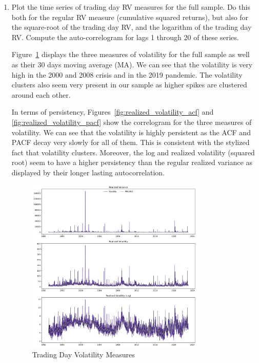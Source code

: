 \documentclass[12pt,twoside]{article}
\begin{document}
\begin{enumerate}[label = \arabic*)]
\begin{solution}
    \end{solution}
    \item Plot the time series of trading day RV measures for the full sample. Do this both for the regular RV measure (cumulative squared returns), but also for the square-root of the trading day RV, and the logarithm of the trading day RV. Compute the auto-correlogram for lags 1 through 20 of these series.
    
    \begin{solution}
        Figure~\ref{fig:realized_volatility} displays the three measures of volatility for the full sample as well as their 30 days moving average (MA). We can see that the volatility is very high in the 2000 and 2008 crisis and in the 2019 pandemic. The volatility clusters also seem very present in our sample as higher spikes are clustered around each other. 

        In terms of persistency, Figures~\ref{fig:realized_volatility_acf} and \ref{fig:realized_volatility_pacf} show the correlogram for the three measures of volatility. We can see that the volatility is highly persistent as the ACF and PACF decay very slowly for all of them. This is consistent with the stylized fact that volatility clusters. Moreover, the log and realized volatility (squared root) seem to have a higher persistency than the regular realized variance as displayed by their longer lasting autocorrelation.
        
        \begin{figure}[!htbp]
            \centering
            \caption{Trading Day Volatility Measures}
            \label{fig:realized_volatility}
            \includegraphics[width=0.8\textwidth]{images/realized_volatility.png}
        \end{figure}
        

\end{solution}
\end{enumerate}
\end{document}
